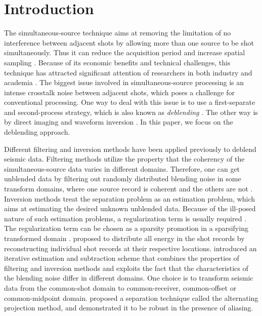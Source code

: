 \section{Introduction}

The simultaneous-source technique aims at removing the limitation of no interference between adjacent shots by allowing more than one source to be shot simultaneously. Thus it can reduce the acquisition period and increase spatial sampling \cite[]{berk}. Because of its economic benefits and technical challenges, this technique has attracted significant attention of researchers in both industry and academia \cite[]{moore2008,mahdad2011,abma,mediandeblend,deblendinv}. The biggest issue involved in simultaneous-source processing is an intense crosstalk noise between adjacent shots, which poses a challenge for conventional processing. One way to deal with this issue is to use a first-separate and second-process strategy, which is also known as \emph{deblending} \cite[]{pana1}. The other way is by direct imaging and waveform inversion \cite[]{berkhout2012,choi2012,plessix2012,guitton2012,zhiguang2014}. In this paper, we focus on the deblending approach.

Different filtering and inversion methods have been applied previously to deblend seismic data. Filtering methods utilize the property that the coherency of the simultaneous-source data varies in different domains. Therefore, one can get unblended data by filtering out randomly distributed blending noise in some transform domains, where one source record is coherent and the others are not \cite[]{gary,iter,mediandeblend}. Inversion methods treat the separation problem as an estimation problem, which aims at estimating the desired unknown unblended data. Because of the ill-posed nature of such estimation problems, a regularization term is usually required \cite[]{pana2}. The regularization term can be chosen as a sparsity promotion in a sparsifying transformed domain \cite[]{abma2010}. \cite{roald} proposed to distribute all energy in the shot records by reconstructing individual shot records at their respective locations. \cite{mahdad2011} introduced an iterative estimation and subtraction scheme that combines the properties of filtering and inversion methods and exploits the fact that the characteristics of the blending noise differ in different domains. One choice is to transform seismic data from the common-shot domain to common-receiver, common-offset or common-midpoint domain. \cite{proj} proposed a separation technique called the alternating projection method, and demonstrated it to be robust in the presence of aliasing. 

